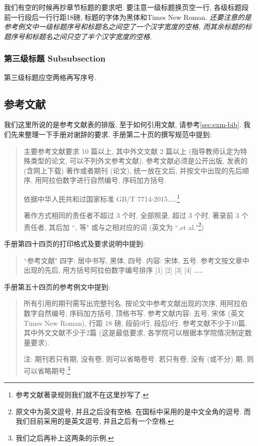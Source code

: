我们有空的时候再抄章节标题的要求吧. 要注意一级标题换页空一行, 各级标题段前一行段后一行行距18磅, 标题的字体为黑体和Times New Roman. \emph{还要注意的是参考例文中一级标题序号和标题名之间空了一个汉字宽度的空格, 而其余标题的标题序号和标题名之间只空了半个汉字宽度的空格.}

\subsubsection{第三级标题 Subsubsection}

第三级标题应空两格再写序号.

\zhlipsum[1]

\subsection{参考文献}

我们这里所说的是参考文献表的排版, 至于如何引用文献, 请参考\ref{sec:exm-bib}. 我们先来整理一下手册对谢辞的要求. 手册第二十页的撰写规范中提到:
\begin{quote}
  主要参考文献要求 10 篇以上, 其中外文文献 2 篇以上 (指导教师认定为特殊类型的论文, 可以不列外文参考文献).  参考文献必须是公开出版, 发表的 (含网上下载) 著作或者期刊 (论文), 统一放在文后, 并按文中出现的先后顺序, 用阿拉伯数字进行自然编号, 序码加方括号.

  依据中华人民共和过国家标准 GB/T 7714-2015\ldots\ldots\footnote{参考文献著录规则我们就不在这里抄写了.}

  著作方式相同的责任者不超过 3 个时, 全部照录, 超过 3 个时, 著录前 3 个责任者, 其后加 ``, 等" 或与之相对应的词 (英文为 ``,et al."\footnote{原文中为英文逗号, 并且之后没有空格. 在国标中采用的是中文全角的逗号. 而我们目前采用的是英文逗号, 并且之后有一个空格.})
\end{quote}
手册第四十四页的打印格式及要求说明中提到:
\begin{quote}
  ``参考文献" 四字: 居中书写, 黑体, 四号.
  内容: 宋体, 五号.
  参考文按文章中出现的先后, 用方括号阿拉伯数字编号排序 [1] [2] [3] [4] \dots\dots
\end{quote}
手册第五十四页的参考例文中提到:
\begin{quote}
  所有引用的期刊需写出完整刊名. 按论文中参考文献出现的次序, 用阿拉伯数字自然编号, 序码加方括号, 顶格书写.
  参考文献内容: 五号, 宋体 (英文 Times New Roman), 行距 18 磅, 段前0行, 段后0行.
  参考文献不少于10篇, 其中外文文献不少于2篇 (这是最低要求, 各学院可以根据本学院情况制定数量要求).

  注: 期刊若只有期, 没有卷, 则可以省略卷号. 若只有卷, 没有 (或不分) 期, 则可以省略期号.\footnote{我们之后再补上这两条的示例.}
\end{quote}


